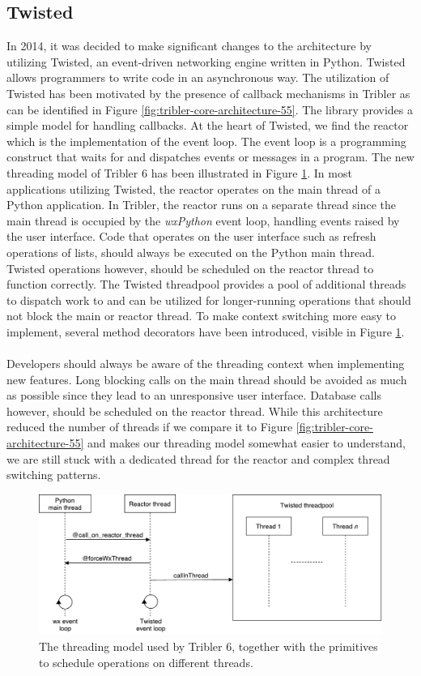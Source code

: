 \subsection{Twisted}
In 2014, it was decided to make significant changes to the architecture by utilizing Twisted, an event-driven networking engine written in Python. Twisted allows programmers to write code in an asynchronous way. The utilization of Twisted has been motivated by the presence of callback mechanisms in Tribler as can be identified in Figure \ref{fig:tribler-core-architecture-55}. The library provides a simple model for handling callbacks. At the heart of Twisted, we find the reactor which is the implementation of the event loop\cite{twistedreactoroverview}. The event loop is a programming construct that waits for and dispatches events or messages in a program.
The new threading model of Tribler 6 has been illustrated in Figure \ref{fig:old-threading-model}. In most applications utilizing Twisted, the reactor operates on the main thread of a Python application. In Tribler, the reactor runs on a separate thread since the main thread is occupied by the \emph{wxPython} event loop, handling events raised by the user interface. Code that operates on the user interface such as refresh operations of lists, should always be executed on the Python main thread. Twisted operations however, should be scheduled on the reactor thread to function correctly. The Twisted threadpool provides a pool of additional threads to dispatch work to and can be utilized for longer-running operations that should not block the main or reactor thread. To make context switching more easy to implement, several method decorators have been introduced, visible in Figure \ref{fig:old-threading-model}.\\\\
Developers should always be aware of the threading context when implementing new features. Long blocking calls on the main thread should be avoided as much as possible since they lead to an unresponsive user interface. Database calls however, should be scheduled on the reactor thread. While this architecture reduced the number of threads if we compare it to Figure \ref{fig:tribler-core-architecture-55} and makes our threading model somewhat easier to understand, we are still stuck with a dedicated thread for the reactor and complex thread switching patterns.

\begin{figure}[h!]
	\centering
	\includegraphics[width=0.9\columnwidth]{images/architecture/threading_model_tribler}
	\caption{The threading model used by Tribler 6, together with the primitives to schedule operations on different threads.}
	\label{fig:old-threading-model}
\end{figure}

